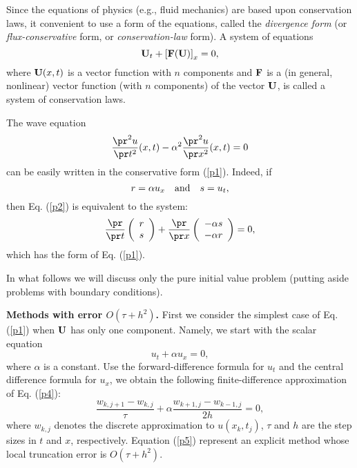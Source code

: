 \vskip 0.3cm
 
Since the equations of physics (e.g., fluid mechanics) are
based upon conservation laws, it convenient to use a form of the equations,
called the {\it divergence form} (or {\it flux-conservative} form, or
{\it conservation-law} form).
A system of equations
\begin{equation}
{\bf U}_{t} + \left[{\bf F}({\bf U})\right]_{x} =0, \label{p1}
\end{equation}
where ${\bf U}(x,t)$ is a vector function with $n$ components and ${\bf F}$ is a
(in general, nonlinear) vector function (with $n$ components) of the vector
${\bf U}$, is called a system of conservation laws.

\vskip 0.3cm
 
The wave equation
\begin{equation}
\frac{\pr^{2} u}{\pr t^{2}}(x,t) - \alpha^{2}\frac{\pr^{2} u}{\pr x^{2}}(x,t)=0  \label{p2}
\end{equation}
can be easily written in the conservative form (\ref{p1}). Indeed, if
\[
r=\alpha u_{x} \quad {\rm and} \quad s=u_{t},
\]
then Eq. (\ref{p2}) is equivalent to the system:
\begin{equation}
\frac{\pr}{\pr t}
\left(
\begin{array}{c}
r \\
s
\end{array}
\right) +
\frac{\pr}{\pr x}
\left(
\begin{array}{c}
-\alpha s \\
-\alpha r
\end{array}
\right)=0, \label{p3}
\end{equation}
which has the form of Eq. (\ref{p1}).

\vskip 0.3cm
 
In what follows we will discuss only the pure initial value problem
(putting aside problems with boundary conditions).

 
 
{\bf Methods with error $O(\tau +h^2)$.} First we consider the simplest case of Eq. (\ref{p1}) when ${\bf U}$ has only
one component. Namely, we start with the scalar equation
\begin{equation}
u_{t} + \alpha u_{x} =0, \label{p4}
\end{equation}
where $\alpha$ is a constant. Use the forward-difference formula
for $u_{t}$ and the central difference formula for $u_{x}$, we obtain
the following finite-difference approximation of Eq. (\ref{p4}):
\begin{equation}
\frac{w_{k,j+1}-w_{k,j}}{\tau} + \alpha \frac{w_{k+1,j}-w_{k-1,j}}{2h} =0, \label{p5}
\end{equation}
where $w_{k,j}$ denotes the discrete approximation to $u(x_{k},t_{j})$, $\tau$ and $h$
are the step sizes in $t$ and $x$, respectively. Equation (\ref{p5})
represent an explicit method whose local truncation error is $O(\tau+h^2)$.

